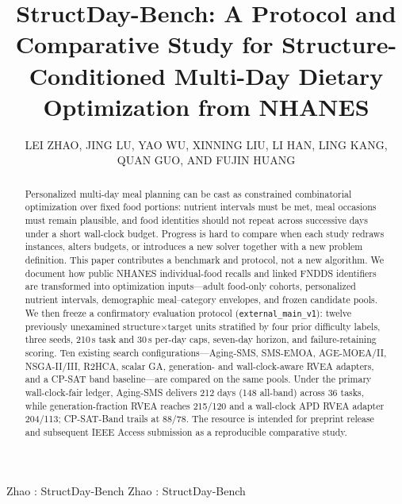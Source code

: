 \documentclass{ieeeaccess}
\begin{document}

\title{StructDay-Bench: A Protocol and Comparative Study for Structure-Conditioned Multi-Day Dietary Optimization from NHANES}
\author{\uppercase{Lei Zhao},
\uppercase{Jing Lu},
\uppercase{Yao Wu},
\uppercase{Xinning Liu},
\uppercase{Li Han},
\uppercase{Ling Kang},
\uppercase{Quan Guo},
AND \uppercase{Fujin Huang}}

\address[1]{Dalian Neusoft University of Information, Dalian, China}
\address[2]{School of Software, Dalian Neusoft University of Information, Dalian, China}
\address[3]{Dalian Scientific Test and Control Technology Institute, Dalian, China}

\markboth
{Zhao \headeretal: StructDay-Bench}
{Zhao \headeretal: StructDay-Bench}


\begin{abstract}
Personalized multi-day meal planning can be cast as constrained combinatorial optimization over fixed food portions: nutrient intervals must be met, meal occasions must remain plausible, and food identities should not repeat across successive days under a short wall-clock budget. Progress is hard to compare when each study redraws instances, alters budgets, or introduces a new solver together with a new problem definition. This paper contributes a benchmark and protocol, not a new algorithm. We document how public NHANES individual-food recalls and linked FNDDS identifiers are transformed into optimization inputs---adult food-only cohorts, personalized nutrient intervals, demographic meal--category envelopes, and frozen candidate pools. We then freeze a confirmatory evaluation protocol (\texttt{external\_main\_v1}): twelve previously unexamined structure$\times$target units stratified by four prior difficulty labels, three seeds, 210\,s task and 30\,s per-day caps, seven-day horizon, and failure-retaining scoring. Ten existing search configurations---Aging-SMS, SMS-EMOA, AGE-MOEA/II, NSGA-II/III, R2HCA, scalar GA, generation- and wall-clock-aware RVEA adapters, and a CP-SAT band baseline---are compared on the same pools. Under the primary wall-clock-fair ledger, Aging-SMS delivers 212 days (148 all-band) across 36 tasks, while generation-fraction RVEA reaches 215/120 and a wall-clock APD RVEA adapter 204/113; CP-SAT-Band trails at 88/78. The resource is intended for preprint release and subsequent IEEE Access submission as a reproducible comparative study.
\end{abstract}
\end{document}
